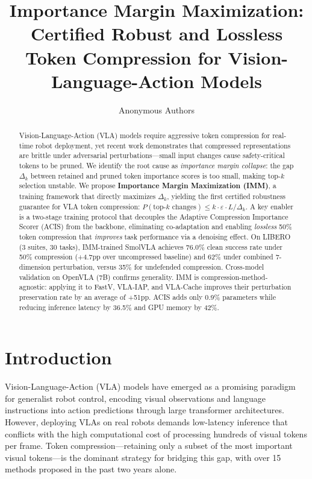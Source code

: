 \documentclass[10pt,twocolumn]{article}
\title{Importance Margin Maximization: Certified Robust and Lossless\\Token Compression for Vision-Language-Action Models}
\author{
  Anonymous Authors
}
\newcommand{\dk}{\Delta_k}
\newcommand{\eps}{\varepsilon}
\begin{document}
\maketitle

\begin{abstract}
Vision-Language-Action (VLA) models require aggressive token compression for real-time robot deployment, yet recent work demonstrates that compressed representations are brittle under adversarial perturbations---small input changes cause safety-critical tokens to be pruned.
We identify the root cause as \emph{importance margin collapse}: the gap $\dk$ between retained and pruned token importance scores is too small, making top-$k$ selection unstable.
We propose \textbf{Importance Margin Maximization (IMM)}, a training framework that directly maximizes $\dk$, yielding the first certified robustness guarantee for VLA token compression: $P(\text{top-}k \text{ changes}) \leq k \cdot \eps \cdot L / \dk$.
A key enabler is a two-stage training protocol that decouples the Adaptive Compression Importance Scorer (ACIS) from the backbone, eliminating co-adaptation and enabling \emph{lossless} 50\% token compression that \emph{improves} task performance via a denoising effect.
On LIBERO (3 suites, 30 tasks), IMM-trained SmolVLA achieves 76.0\% clean success rate under 50\% compression (+4.7pp over uncompressed baseline) and 62\% under combined 7-dimension perturbation, versus 35\% for undefended compression.
Cross-model validation on OpenVLA (7B) confirms generality.
IMM is compression-method-agnostic: applying it to FastV, VLA-IAP, and VLA-Cache improves their perturbation preservation rate by an average of +51pp.
ACIS adds only 0.9\% parameters while reducing inference latency by 36.5\% and GPU memory by 42\%.
\end{abstract}

\section{Introduction}
\label{sec:intro}

Vision-Language-Action (VLA) models have emerged as a promising paradigm for generalist robot control, encoding visual observations and language instructions into action predictions through large transformer architectures.
However, deploying VLAs on real robots demands low-latency inference that conflicts with the high computational cost of processing hundreds of visual tokens per frame.
Token compression---retaining only a subset of the most important visual tokens---is the dominant strategy for bridging this gap, with over 15 methods proposed in the past two years alone.
\end{document}
